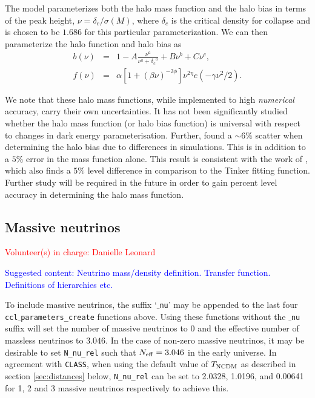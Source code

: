\documentclass[\docopts]{\docclass}
\newcommand{\vol}[1]{\textcolor{red}{Volunteer(s) in charge: #1}}
\newcommand{\cont}[1]{\textcolor{blue}{Suggested content: #1}}
\begin{document}
The \citet{Tinker2010} model parameterizes both the halo mass function and the halo bias in terms of the peak height, $\nu = \delta_c / \sigma(M)$, where $\delta_c$ is the critical density for collapse and is chosen to be $1.686$ for this particular parameterization. We can then parameterize the halo function and halo bias as
\begin{eqnarray}
  b(\nu) &=& 1 - A\frac{\nu^a}{\nu^a + {\delta_c}^a} + B\nu^b+C\nu^c,\\
  f(\nu) &=& \alpha[1+(\beta\nu)^{-2\phi}]\nu^{2\eta}e(-\gamma\nu^2/2).
\end{eqnarray}

We note that these halo mass functions, while implemented to high {\em numerical} accuracy, carry their own uncertainties. It has not been significantly studied whether the halo mass function (or halo bias function) is universal with respect to changes in dark energy parameterisation. Further, \citet{Tinker2010} found a $\sim6\%$ scatter when determining the halo bias due to differences in simulations. This is in addition to a $5\%$ error in the mass function alone. This result is consistent with the work of \citet{Watson2013}, which also finds a $5\%$ level difference in comparison to the Tinker fitting function. Further study will be required in the future in order to gain percent level accuracy in determining the halo mass function.

\subsection{Massive neutrinos}
\vol{Danielle Leonard}

\cont{Neutrino mass/density definition. Transfer function. Definitions of hierarchies etc.}

To include massive neutrinos, the suffix `{\tt $\_$nu}' may be appended to the last four {\tt ccl$\_$parameters\_create} functions above. Using these functions without the {\tt $\_$nu} suffix will set the number of massive neutrinos to 0 and the effective number of massless neutrinos to $3.046$. In the case of non-zero massive neutrinos, it may be desirable to set {\tt N\_nu\_rel} such that $N_{\rm eff}=3.046$ in the early universe. In agreement with {\tt CLASS}, when using the default value of $T_{\rm NCDM}$ as described in section \ref{sec:distances} below, {\tt N\_nu\_rel} can be set to 2.0328, 1.0196, and 0.00641 for 1, 2 and 3 massive neutrinos respectively to achieve this.
\end{document}
